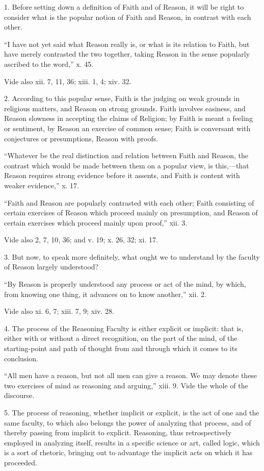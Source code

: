 1. Before setting down a definition of Faith and of Reason, it will
be right to consider what is the popular notion of Faith and Reason,
in contrast with each other.


``I have not yet said what Reason really is, or what is its
relation to Faith, but have merely contrasted the two together,
taking Reason in the sense popularly ascribed to the word,'' x.
45.


Vide also xii. 7, 11, 36; xiii. 1, 4; xiv. 32.


2. According to this popular sense, Faith is the judging on weak
grounds in religious matters, and Reason on strong grounds. Faith
involves easiness, and Reason slowness in accepting the claims of
Religion; by Faith is meant a feeling or sentiment, by Reason an
exercise of common sense; Faith is conversant with conjectures or
presumptions, Reason with proofs.


``Whatever be the real distinction and relation between Faith
and Reason, the contrast which would be made between them on a
popular view, is this,—that Reason requires strong evidence before
it assents, and Faith is content with weaker evidence,'' x. 17.


``Faith and Reason are popularly contrasted with each other;
Faith consisting of certain exercises of Reason which proceed mainly
on presumption, and Reason of certain exercises which proceed mainly
upon proof,'' xii. 3.


Vide also 2, 7, 10, 36; and v. 19; x. 26, 32; xi. 17.


3. But now, to speak more definitely, what ought we to understand
by the faculty of Reason largely understood?


``By Reason is properly understood any process or act of the
mind, by which, from knowing one thing, it advances on to know
another,'' xii. 2.


Vide also xi. 6, 7; xiii. 7, 9; xiv. 28.


4. The process of the Reasoning Faculty is either explicit or
implicit: that is, either with or without a direct recognition, on the
part of the mind, of the starting-point and path of thought from and
through which it comes to its conclusion.


``All men have a reason, but not all men can give a reason.
We may denote these two exercises of mind as reasoning and
arguing,'' xiii. 9. Vide the whole of the discourse.


5. The process of reasoning, whether implicit or explicit, is the
act of one and the same faculty, to which also belongs the power of
analyzing that process, and of thereby passing from implicit to
explicit. Reasoning, thus retrospectively employed in analyzing
itself, results in a specific science or art, called logic, which is a
sort of rhetoric, bringing out to advantage the implicit acts on which
it has proceeded.


